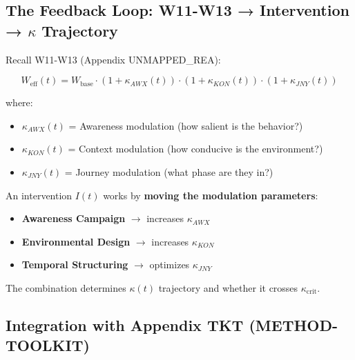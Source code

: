 \documentclass[11pt, a4paper]{article}
\begin{document}
\subsection{The Feedback Loop: W11-W13 → Intervention → $\kappa$ Trajectory}

Recall W11-W13 (Appendix UNMAPPED_REA):

\begin{equation}
W_{\text{eff}}(t) = W_{\text{base}} \cdot (1 + \kappa_{AWX}(t)) \cdot (1 + \kappa_{KON}(t)) \cdot (1 + \kappa_{JNY}(t))
\end{equation}

\noindent
where:
\begin{itemize}
    \item $\kappa_{AWX}(t)$ = Awareness modulation (how salient is the behavior?)
    \item $\kappa_{KON}(t)$ = Context modulation (how conducive is the environment?)
    \item $\kappa_{JNY}(t)$ = Journey modulation (what phase are they in?)
\end{itemize}

\noindent
An intervention $I(t)$ works by \textbf{moving the modulation parameters}:

\begin{itemize}
    \item \textbf{Awareness Campaign} $\to$ increases $\kappa_{AWX}$
    \item \textbf{Environmental Design} $\to$ increases $\kappa_{KON}$
    \item \textbf{Temporal Structuring} $\to$ optimizes $\kappa_{JNY}$
\end{itemize}

\noindent
The combination determines $\kappa(t)$ trajectory and whether it crosses $\kappa_{\text{crit}}$.

\subsection{Integration with Appendix TKT (METHOD-TOOLKIT)}
\label{sec:bb-hhh-integration}
\end{document}
